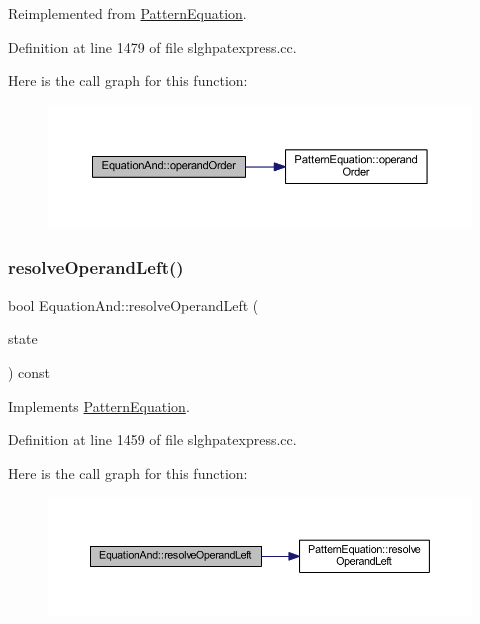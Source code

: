 Reimplemented from \mbox{\hyperlink{class_pattern_equation_a944d7114e5d5b6876352e555cc060829}{Pattern\+Equation}}.



Definition at line 1479 of file slghpatexpress.\+cc.

Here is the call graph for this function\+:
\nopagebreak
\begin{figure}[H]
\begin{center}
\leavevmode
\includegraphics[width=350pt]{class_equation_and_a6afd29fe0c292441a2fb1edf671ba5ef_cgraph}
\end{center}
\end{figure}
\mbox{\label{class_equation_and_a794c3ebf0951a854cdd31b99cce09937}} 
\subsubsection{\texorpdfstring{resolveOperandLeft()}{resolveOperandLeft()}}
{\footnotesize\ttfamily bool Equation\+And\+::resolve\+Operand\+Left (\begin{DoxyParamCaption}\item[{\mbox{\hyperlink{struct_operand_resolve}{Operand\+Resolve}} \&}]{state }\end{DoxyParamCaption}) const\hspace{0.3cm}{\ttfamily [virtual]}}



Implements \mbox{\hyperlink{class_pattern_equation_a16e885a945df91e3daf2dea6394ae6f2}{Pattern\+Equation}}.



Definition at line 1459 of file slghpatexpress.\+cc.

Here is the call graph for this function\+:
\nopagebreak
\begin{figure}[H]
\begin{center}
\leavevmode
\includegraphics[width=350pt]{class_equation_and_a794c3ebf0951a854cdd31b99cce09937_cgraph}
\end{center}
\end{figure}


